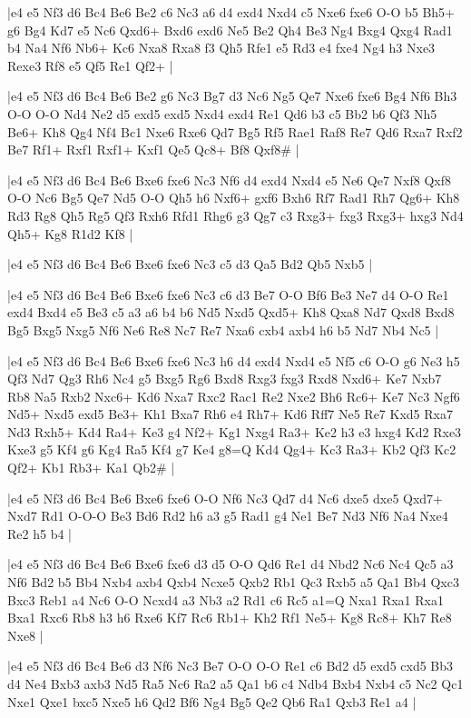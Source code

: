 \whitename{}
\blackname{}
\makegametitle
|e4 e5 Nf3 d6 Bc4 Be6 Be2 c6 Nc3 a6 d4 exd4 Nxd4 c5 Nxe6 fxe6 O-O b5 Bh5+ g6 Bg4 Kd7 e5 Nc6 Qxd6+ Bxd6 exd6 Ne5 Be2 Qh4 Be3 Ng4 Bxg4 Qxg4 Rad1 b4 Na4 Nf6 Nb6+ Kc6 Nxa8 Rxa8 f3 Qh5 Rfe1 e5 Rd3 e4 fxe4 Ng4 h3 Nxe3 Rexe3 Rf8 e5 Qf5 Re1 Qf2+  |

\whitename{}
\blackname{}
\makegametitle
|e4 e5 Nf3 d6 Bc4 Be6 Be2 g6 Nc3 Bg7 d3 Nc6 Ng5 Qe7 Nxe6 fxe6 Bg4 Nf6 Bh3 O-O O-O Nd4 Ne2 d5 exd5 exd5 Nxd4 exd4 Re1 Qd6 b3 c5 Bb2 b6 Qf3 Nh5 Be6+ Kh8 Qg4 Nf4 Bc1 Nxe6 Rxe6 Qd7 Bg5 Rf5 Rae1 Raf8 Re7 Qd6 Rxa7 Rxf2 Be7 Rf1+ Rxf1 Rxf1+ Kxf1 Qe5 Qc8+ Bf8 Qxf8\#  |

\whitename{}
\blackname{}
\makegametitle
|e4 e5 Nf3 d6 Bc4 Be6 Bxe6 fxe6 Nc3 Nf6 d4 exd4 Nxd4 e5 Ne6 Qe7 Nxf8 Qxf8 O-O Nc6 Bg5 Qe7 Nd5 O-O Qh5 h6 Nxf6+ gxf6 Bxh6 Rf7 Rad1 Rh7 Qg6+ Kh8 Rd3 Rg8 Qh5 Rg5 Qf3 Rxh6 Rfd1 Rhg6 g3 Qg7 c3 Rxg3+ fxg3 Rxg3+ hxg3 Nd4 Qh5+ Kg8 R1d2 Kf8  |

\whitename{}
\blackname{}
\makegametitle
|e4 e5 Nf3 d6 Bc4 Be6 Bxe6 fxe6 Nc3 c5 d3 Qa5 Bd2 Qb5 Nxb5  |

\whitename{}
\blackname{}
\makegametitle
|e4 e5 Nf3 d6 Bc4 Be6 Bxe6 fxe6 Nc3 c6 d3 Be7 O-O Bf6 Be3 Ne7 d4 O-O Re1 exd4 Bxd4 e5 Be3 c5 a3 a6 b4 b6 Nd5 Nxd5 Qxd5+ Kh8 Qxa8 Nd7 Qxd8 Bxd8 Bg5 Bxg5 Nxg5 Nf6 Ne6 Re8 Nc7 Re7 Nxa6 cxb4 axb4 h6 b5 Nd7 Nb4 Nc5  |

\whitename{}
\blackname{}
\makegametitle
|e4 e5 Nf3 d6 Bc4 Be6 Bxe6 fxe6 Nc3 h6 d4 exd4 Nxd4 e5 Nf5 c6 O-O g6 Ne3 h5 Qf3 Nd7 Qg3 Rh6 Nc4 g5 Bxg5 Rg6 Bxd8 Rxg3 fxg3 Rxd8 Nxd6+ Ke7 Nxb7 Rb8 Na5 Rxb2 Nxc6+ Kd6 Nxa7 Rxc2 Rac1 Re2 Nxe2 Bh6 Rc6+ Ke7 Nc3 Ngf6 Nd5+ Nxd5 exd5 Be3+ Kh1 Bxa7 Rh6 e4 Rh7+ Kd6 Rff7 Ne5 Re7 Kxd5 Rxa7 Nd3 Rxh5+ Kd4 Ra4+ Ke3 g4 Nf2+ Kg1 Nxg4 Ra3+ Ke2 h3 e3 hxg4 Kd2 Rxe3 Kxe3 g5 Kf4 g6 Kg4 Ra5 Kf4 g7 Ke4 g8=Q Kd4 Qg4+ Kc3 Ra3+ Kb2 Qf3 Kc2 Qf2+ Kb1 Rb3+ Ka1 Qb2\#  |

\whitename{}
\blackname{}
\makegametitle
|e4 e5 Nf3 d6 Bc4 Be6 Bxe6 fxe6 O-O Nf6 Nc3 Qd7 d4 Nc6 dxe5 dxe5 Qxd7+ Nxd7 Rd1 O-O-O Be3 Bd6 Rd2 h6 a3 g5 Rad1 g4 Ne1 Be7 Nd3 Nf6 Na4 Nxe4 Re2 h5 b4  |

\whitename{}
\blackname{}
\makegametitle
|e4 e5 Nf3 d6 Bc4 Be6 Bxe6 fxe6 d3 d5 O-O Qd6 Re1 d4 Nbd2 Nc6 Nc4 Qc5 a3 Nf6 Bd2 b5 Bb4 Nxb4 axb4 Qxb4 Ncxe5 Qxb2 Rb1 Qc3 Rxb5 a5 Qa1 Bb4 Qxc3 Bxc3 Reb1 a4 Nc6 O-O Ncxd4 a3 Nb3 a2 Rd1 c6 Rc5 a1=Q Nxa1 Rxa1 Rxa1 Bxa1 Rxc6 Rb8 h3 h6 Rxe6 Kf7 Rc6 Rb1+ Kh2 Rf1 Ne5+ Kg8 Rc8+ Kh7 Re8 Nxe8  |

\whitename{}
\blackname{}
\makegametitle
|e4 e5 Nf3 d6 Bc4 Be6 d3 Nf6 Nc3 Be7 O-O O-O Re1 c6 Bd2 d5 exd5 cxd5 Bb3 d4 Ne4 Bxb3 axb3 Nd5 Ra5 Nc6 Ra2 a5 Qa1 b6 c4 Ndb4 Bxb4 Nxb4 c5 Nc2 Qc1 Nxe1 Qxe1 bxc5 Nxe5 h6 Qd2 Bf6 Ng4 Bg5 Qe2 Qb6 Ra1 Qxb3 Re1 a4  |

